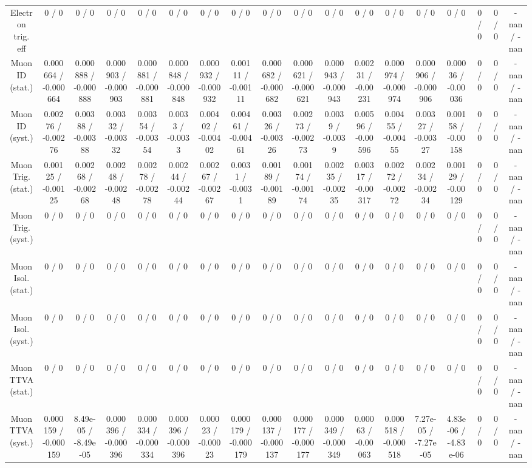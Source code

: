 \documentclass[10pt]{article}
\begin{document}
\begin{table}[htbp]
\begin{center}
\begin{tabular}{|c|c|c|c|c|c|c|c|c|c|c|c|c|c|c|c|c|c|}
  Electron trig. eff & 0 / 0 & 0 / 0 & 0 / 0 & 0 / 0 & 0 / 0 & 0 / 0 & 0 / 0 & 0 / 0 & 0 / 0 & 0 / 0 & 0 / 0 & 0 / 0 & 0 / 0 & 0 / 0 & 0 / 0 & 0 / 0 & -nan / -nan \\ 
  Muon ID (stat.) & 0.000664 / -0.000664 & 0.000888 / -0.000888 & 0.000903 / -0.000903 & 0.000881 / -0.000881 & 0.000848 / -0.000848 & 0.000932 / -0.000932 & 0.00111 / -0.00111 & 0.000682 / -0.000682 & 0.000621 / -0.000621 & 0.000943 / -0.000943 & 0.00231 / -0.00231 & 0.000974 / -0.000974 & 0.000906 / -0.000906 & 0.00036 / -0.00036 & 0 / 0 & 0 / 0 & -nan / -nan \\ 
  Muon ID (syst.) & 0.00276 / -0.00276 & 0.00388 / -0.00388 & 0.00332 / -0.00332 & 0.00354 / -0.00354 & 0.0033 / -0.0033 & 0.00402 / -0.00402 & 0.00461 / -0.00461 & 0.00326 / -0.00326 & 0.00273 / -0.00273 & 0.0039 / -0.0039 & 0.00596 / -0.00596 & 0.00455 / -0.00455 & 0.00327 / -0.00327 & 0.00158 / -0.00158 & 0 / 0 & 0 / 0 & -nan / -nan \\ 
  Muon Trig. (stat.) & 0.00125 / -0.00125 & 0.00268 / -0.00268 & 0.00248 / -0.00248 & 0.00278 / -0.00278 & 0.00244 / -0.00244 & 0.00267 / -0.00267 & 0.0031 / -0.0031 & 0.00189 / -0.00189 & 0.00174 / -0.00174 & 0.00235 / -0.00235 & 0.00317 / -0.00317 & 0.00272 / -0.00272 & 0.00234 / -0.00234 & 0.00129 / -0.00129 & 0 / 0 & 0 / 0 & -nan / -nan \\ 
  Muon Trig. (syst.) & 0 / 0 & 0 / 0 & 0 / 0 & 0 / 0 & 0 / 0 & 0 / 0 & 0 / 0 & 0 / 0 & 0 / 0 & 0 / 0 & 0 / 0 & 0 / 0 & 0 / 0 & 0 / 0 & 0 / 0 & 0 / 0 & -nan / -nan \\ 
  Muon Isol. (stat.) & 0 / 0 & 0 / 0 & 0 / 0 & 0 / 0 & 0 / 0 & 0 / 0 & 0 / 0 & 0 / 0 & 0 / 0 & 0 / 0 & 0 / 0 & 0 / 0 & 0 / 0 & 0 / 0 & 0 / 0 & 0 / 0 & -nan / -nan \\ 
  Muon Isol. (syst.) & 0 / 0 & 0 / 0 & 0 / 0 & 0 / 0 & 0 / 0 & 0 / 0 & 0 / 0 & 0 / 0 & 0 / 0 & 0 / 0 & 0 / 0 & 0 / 0 & 0 / 0 & 0 / 0 & 0 / 0 & 0 / 0 & -nan / -nan \\ 
  Muon TTVA (stat.) & 0 / 0 & 0 / 0 & 0 / 0 & 0 / 0 & 0 / 0 & 0 / 0 & 0 / 0 & 0 / 0 & 0 / 0 & 0 / 0 & 0 / 0 & 0 / 0 & 0 / 0 & 0 / 0 & 0 / 0 & 0 / 0 & -nan / -nan \\ 
  Muon TTVA (syst.) & 0.000159 / -0.000159 & 8.49e-05 / -8.49e-05 & 0.000396 / -0.000396 & 0.000334 / -0.000334 & 0.000396 / -0.000396 & 0.00023 / -0.00023 & 0.000179 / -0.000179 & 0.000137 / -0.000137 & 0.000177 / -0.000177 & 0.000349 / -0.000349 & 0.00063 / -0.00063 & 0.000518 / -0.000518 & 7.27e-05 / -7.27e-05 & 4.83e-06 / -4.83e-06 & 0 / 0 & 0 / 0 & -nan / -nan \\ 

\end{tabular}
\end{center}
\end{table}
\end{document}
